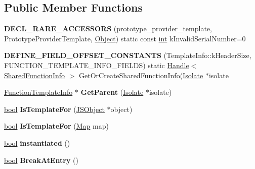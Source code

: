 \subsection*{Public Member Functions}
\begin{DoxyCompactItemize}
\item 
\mbox{\label{classv8_1_1internal_1_1FunctionTemplateInfo_ac7ebb15a1cb03933fa79ef6faab5174d}} 
{\bfseries D\+E\+C\+L\+\_\+\+R\+A\+R\+E\+\_\+\+A\+C\+C\+E\+S\+S\+O\+RS} (prototype\+\_\+provider\+\_\+template, Prototype\+Provider\+Template, \mbox{\hyperlink{classv8_1_1internal_1_1Object}{Object}}) static const \mbox{\hyperlink{classint}{int}} k\+Invalid\+Serial\+Number=0
\item 
\mbox{\label{classv8_1_1internal_1_1FunctionTemplateInfo_aa3dde20e61f820b536e74feb98ede628}} 
{\bfseries D\+E\+F\+I\+N\+E\+\_\+\+F\+I\+E\+L\+D\+\_\+\+O\+F\+F\+S\+E\+T\+\_\+\+C\+O\+N\+S\+T\+A\+N\+TS} (Template\+Info\+::k\+Header\+Size, F\+U\+N\+C\+T\+I\+O\+N\+\_\+\+T\+E\+M\+P\+L\+A\+T\+E\+\_\+\+I\+N\+F\+O\+\_\+\+F\+I\+E\+L\+DS) static \mbox{\hyperlink{classv8_1_1internal_1_1Handle}{Handle}}$<$ \mbox{\hyperlink{classv8_1_1internal_1_1SharedFunctionInfo}{Shared\+Function\+Info}} $>$ Get\+Or\+Create\+Shared\+Function\+Info(\mbox{\hyperlink{classv8_1_1internal_1_1Isolate}{Isolate}} $\ast$isolate
\item 
\mbox{\label{classv8_1_1internal_1_1FunctionTemplateInfo_af3c439c6cd31c6815c32de7529b708b9}} 
\mbox{\hyperlink{classv8_1_1internal_1_1FunctionTemplateInfo}{Function\+Template\+Info}} $\ast$ {\bfseries Get\+Parent} (\mbox{\hyperlink{classv8_1_1internal_1_1Isolate}{Isolate}} $\ast$isolate)
\item 
\mbox{\label{classv8_1_1internal_1_1FunctionTemplateInfo_a8ea1e82d99fa2847258ea4925c3fcc4c}} 
\mbox{\hyperlink{classbool}{bool}} {\bfseries Is\+Template\+For} (\mbox{\hyperlink{classv8_1_1internal_1_1JSObject}{J\+S\+Object}} $\ast$object)
\item 
\mbox{\label{classv8_1_1internal_1_1FunctionTemplateInfo_a0f7eec9770d19f3382af88b504d56654}} 
\mbox{\hyperlink{classbool}{bool}} {\bfseries Is\+Template\+For} (\mbox{\hyperlink{classv8_1_1internal_1_1Map}{Map}} map)
\item 
\mbox{\label{classv8_1_1internal_1_1FunctionTemplateInfo_a6d32c1d26383079e9ffdbb5ab9112f4e}} 
\mbox{\hyperlink{classbool}{bool}} {\bfseries instantiated} ()
\item 
\mbox{\label{classv8_1_1internal_1_1FunctionTemplateInfo_a79c0340a488f82ca193b991cf6689ce1}} 
\mbox{\hyperlink{classbool}{bool}} {\bfseries Break\+At\+Entry} ()
\end{DoxyCompactItemize}
